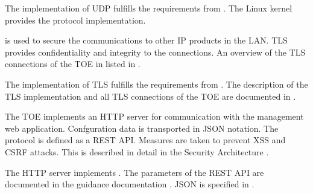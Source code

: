 The implementation of UDP fulfills the requirements from . The Linux
kernel provides the protocol implementation.





\lslantls{} is used to secure the communications to other IP products in the
LAN. TLS provides confidentiality and integrity to the connections. An overview
of the TLS connections of the TOE in listed in .





The implementation of TLS fulfills the requirements from . The
description of the TLS implementation and all TLS connections of the TOE are
documented in .





The TOE implements an HTTP server for communication with the management web
application. Confguration data is transported in JSON notation. The protocol is
defined as a REST API. Measures are taken to prevent XSS and CSRF attacks. This
is described in detail in the Security Architecture \autocite{adv_arc}.





The HTTP server implements . The parameters of the REST API are
documented in the guidance documentation \autocite{agd_adm}. JSON is specified
in .




